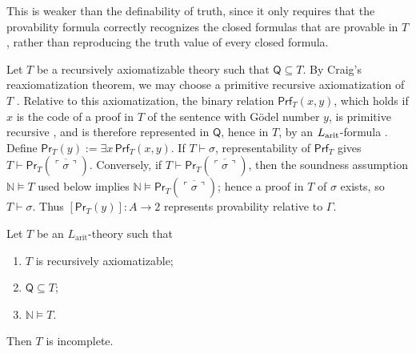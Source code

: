 This is weaker than the definability of truth, since it only requires that the provability formula correctly recognizes the closed formulas that are provable in $T$,
rather than reproducing the truth value of every closed formula.

\begin{remark}
    Let $T$ be a recursively axiomatizable theory such that $\mathsf Q \subseteq T$. By Craig's reaxiomatization theorem, we may choose a primitive recursive axiomatization of $T$ \cite[Propositions~6.15 and~6.16, pp.~146--147]{ZachIncompletenessComputability2026}.
    Relative to this axiomatization, the binary relation $\mathsf{Prf}_T(x,y)$, which holds if $x$ is the code of a proof in $T$ of the sentence with Gödel number $y$, is primitive recursive \cite[Proposition~3.19, pp.~73--74]{ZachIncompletenessComputability2026}, and is therefore represented in $\mathsf Q$, hence in $T$, by an $L_{\textnormal{arit}}$-formula \cite[Definition~4.28 and Theorem~4.29, pp.~97--98]{ZachIncompletenessComputability2026}.\newline\label{idx:proof-predicate}
    Define $\mathsf{Pr}_T(y):=\exists x\,\mathsf{Prf}_T(x,y)$. If $T\vdash\sigma$, representability of $\mathsf{Prf}_T$ gives $T\vdash\mathsf{Pr}_T(\overline{\ulcorner\sigma\urcorner})$. Conversely, if $T\vdash\mathsf{Pr}_T(\overline{\ulcorner\sigma\urcorner})$, then the soundness assumption $\mathbb N\models T$ used below implies $\mathbb N\models\mathsf{Pr}_T(\overline{\ulcorner\sigma\urcorner})$; hence a proof in $T$ of $\sigma$ exists, so $T\vdash\sigma$. Thus $[\mathsf{Pr}_T(y)]:A\to2$ represents provability relative to $\Gamma$.
\end{remark}

\begin{theorem}
    Let $T$ be an $L_{\mathrm{arit}}$-theory such that
    \begin{enumerate}[label=(\roman*)]
        \item $T$ is recursively axiomatizable;
        \item $\mathsf Q\subseteq T$;
        \item $\mathbb N\models T$.
    \end{enumerate}
    Then $T$ is incomplete.
\end{theorem}

